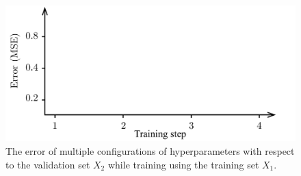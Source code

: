 \begin{figure}[t]
  \centering
  \includegraphics[width=1.0\columnwidth]{include/assets/figures/validation.pdf}
  \caption{
    The error of multiple configurations of hyperparameters with respect to the
    validation set $X_2$ while training using the training set $X_1$.
  }
  \vspace{-1.5em}
\end{figure}
